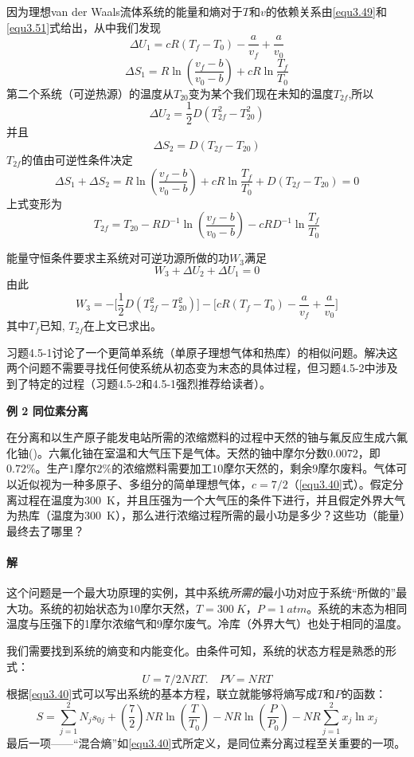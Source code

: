 因为理想van der Waals流体系统的能量和熵对于$T$和$v$的依赖关系由\ref{equ3.49}和\ref{equ3.51}式给出，从中我们发现
\[\Delta U_1 = cR(T_f - T_0) -\frac{a}{v_f} + \frac{a}{v_0}\]
\[\Delta S_1 = R\ln \left(\frac{v_f-b}{v_0-b} \right) + cR\ln\frac{T_f}{T_0}\]
第二个系统（可逆热源）的温度从$T_{20}$变为某个我们现在未知的温度$T_{2f}$,所以
\[\Delta U_2 = \frac{1}{2}D(T^2_{2f} - T^2_{20})\]
并且
\[\Delta S_2 = D(T_{2f} - T_{20})\]
$T_{2f}$的值由可逆性条件决定
\[
	\Delta S_1 + \Delta S_2 = R \ln \left( \frac{v_f - b}{v_0 - b} \right) + cR \ln \frac{T_f}{T_0} + D(T_{2f} - T_{20}) = 0
\]
上式变形为
\[
	T_{2f} = T_{20} - RD^{-1} \ln \left( \frac{v_f - b}{v_0 - b} \right) - cRD^{-1} \ln \frac{T_f}{T_0}
\]

能量守恒条件要求主系统对可逆功源所做的功$W_3$满足
\[W_3 + \Delta U_2 + \Delta U_1 = 0\]
由此
\[W_3 = -\Big[ \frac{1}{2} D(T^2_{2f} - T^2_{20}) \Big] - \Big[cR(T_f - T_0)-\frac{a}{v_f}+\frac{a}{v_0} \Big] \]
其中$T_f$已知, $T_{2f}$在上文已求出。

习题4.5-1讨论了一个更简单系统（单原子理想气体和热库）的相似问题。解决这两个问题不需要寻找任何使系统从初态变为末态的具体过程，但习题4.5-2中涉及到了特定的过程（习题4.5-2和4.5-1强烈推荐给读者）。

\textbf{例 2 \quad 同位素分离}

在分离和以生产原子能发电站所需的浓缩燃料的过程中天然的铀与氟反应生成六氟化铀()。六氟化铀在室温和大气压下是气体。天然的铀中摩尔分数$0.0072$，即$0.72 \%$。生产$1$摩尔$2 \%$的浓缩燃料需要加工$10$摩尔天然的，剩余$9$摩尔废料。气体可以近似视为一种多原子、多组分的简单理想气体，$c = 7/2$（\eqref{equ3.40}式）。假定分离过程在温度为\SI{300}{K}，并且压强为一个大气压的条件下进行，并且假定外界大气为热库（温度为\SI{300}{K}），那么进行浓缩过程所需的最小功是多少？这些功（能量）最终去了哪里？

\paragraph{解} 这个问题是一个最大功原理的实例，其中系统{\it 所需的}最小功对应于系统“所做的”最大功。系统的初始状态为$10$摩尔天然，$T = \SI{300}{K}$，$P = \SI{1}{atm}$。系统的末态为相同温度与压强下的1摩尔浓缩气和9摩尔废气。冷库（外界大气）也处于相同的温度。

我们需要找到系统的熵变和内能变化。由条件可知，系统的状态方程是熟悉的形式：
\[U = 7/2NRT. \quad PV = NRT\]
根据\eqref{equ3.40}式可以写出系统的基本方程，联立就能够将熵写成$T$和$P$的函数：
\[S = \sum_{j=1}^2 N_j s_{0j} + \left( \frac{7}{2} \right) NR \ln \left( \frac{T}{T_0} \right) - NR \ln \left( \frac{P}{P_0} \right)- NR \sum_{j=1}^2  x_j \ln x_j\]
最后一项——“混合熵”如\eqref{equ3.40}式所定义，是同位素分离过程至关重要的一项。

